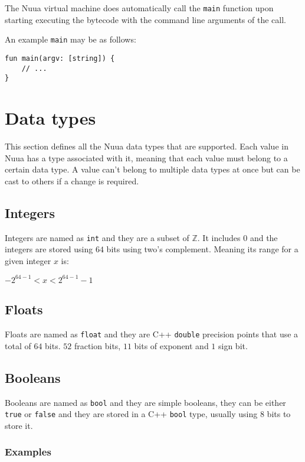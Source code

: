 The Nuua virtual machine does automatically call the \texttt{main} function upon starting executing the bytecode with the command
line arguments of the call.

An example \texttt{main} may be as follows:

\begin{lstlisting}
fun main(argv: [string]) {
    // ...
}
\end{lstlisting}

\section{Data types}

This section defines all the Nuua data types that are supported. Each value in Nuua
has a type associated with it, meaning that each value must belong to a certain data type.
A value can't belong to multiple data types at once but can be cast to others if a change is required.

\subsection{Integers}

Integers are named as \texttt{int} and they are a subset of $\mathbb{Z}$. It includes 0
and the integers are stored using $64$ bits using two's complement. Meaning its range for a given integer $x$ is:

\begin{center}
$-2^{64 - 1} < x < 2^{64 - 1} - 1$
\end{center}

\subsection{Floats}

Floats are named as \texttt{float} and they are C++ \texttt{double} precision points that use a total of $64$ bits. $52$ fraction bits, $11$ bits
of exponent and $1$ sign bit.

\subsection{Booleans}

Booleans are named as \texttt{bool} and they are simple booleans, they can be either \texttt{true} or \texttt{false} and they are stored in
a C++ \texttt{bool} type, usually using 8 bits to store it.

\subsubsection{Examples}

